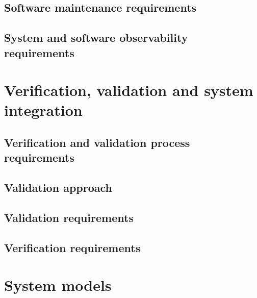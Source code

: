 \subsection{Software maintenance requirements}
\subsection{System and software observability requirements}
\section{Verification, validation and system integration}
 \subsection{Verification and validation process requirements}
 \subsection{Validation approach}
 \subsection{Validation requirements}
 \subsection{Verification requirements}
 \section{System models}


